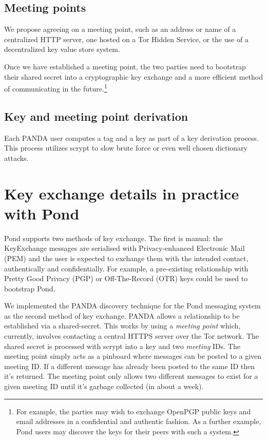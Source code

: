 \documentclass[letterpaper,twocolumn,10pt]{article}
\begin{document}
\subsection{Meeting points}

We propose agreeing on a meeting point, such as an address or name of a
centralized HTTP server, one hosted on a Tor Hidden
Service\cite{Dingledine04tor:the}, or the use of a
decentralized key value store system.

Once we have established a meeting point, the two parties need to bootstrap
their shared secret into a cryptographic key exchange and a more efficient
method of communicating in the future.\footnote{For example, the parties may wish to
exchange OpenPGP public keys and email addresses in a confidential and
authentic fashion. As a further example, Pond users may discover the
keys for their peers with such a system.}

\subsection{Key and meeting point derivation}

Each PANDA user computes a tag and a key as part of a key derivation process.
This process utilizes scrypt\cite{scrypt} to slow brute force or
even well chosen dictionary attacks.

\section{Key exchange details in practice with Pond}

Pond supports two methods of key exchange. The first is manual: the KeyExchange
messages are serialised with Privacy-enhanced Electronic Mail (PEM)\cite{pem}
and the user is expected to exchange them with the intended contact,
authentically and confidentially. For example, a pre-existing relationship with
Pretty Good Privacy (PGP)\cite{pgp} or Off-The-Record (OTR)\cite{otr} keys
could be used to bootstrap Pond.

We implemented\cite{panda} the PANDA discovery technique for the
Pond\cite{pond} messaging system as the second method of key exchange. PANDA
allows a relationship to be established via a shared-secret. This works by
using a {\it meeting point} which, currently, involves contacting a central
HTTPS server over the Tor\cite{Dingledine04tor:the} network. The shared secret is processed with
scrypt\cite{scrypt} into a key and two {\it meeting} IDs. The meeting point
simply acts as a pinboard where messages can be posted to a given meeting ID.
If a different message has already been posted to the same ID then it's
returned. The meeting point only allows two different messages to exist for a
given meeting ID until it's garbage collected (in about a week).
\end{document}
